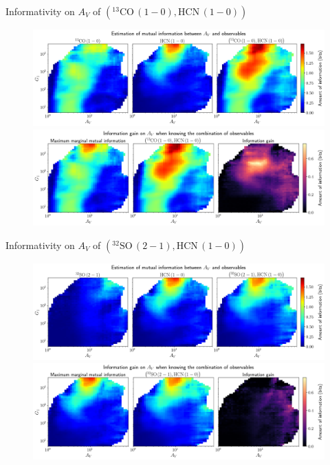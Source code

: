 \documentclass{beamer}
\begin{document}
\begin{frame}{Informativity on $A_V$ of $\left(\mathrm{^{13}CO\,(1-0)},\mathrm{HCN\,(1-0)}\right)$}
    \begin{figure}
        \centering
        \includegraphics[width=0.95\linewidth]{../mi/av__13co10_hcn10_mi.png}
        \vfill
        \includegraphics[width=0.95\linewidth]{../mi/av__13co10_hcn10_mi_gain.png}
    \end{figure}
\end{frame}

\begin{frame}{Informativity on $A_V$ of $\left(\mathrm{^{32}SO\,(2-1)},\mathrm{HCN\,(1-0)}\right)$}
    \begin{figure}
        \centering
        \includegraphics[width=0.95\linewidth]{../mi/av__32so21_hcn10_mi.png}
        \vfill
        \includegraphics[width=0.95\linewidth]{../mi/av__32so21_hcn10_mi_gain.png}
    \end{figure}
\end{frame}
\end{document}
